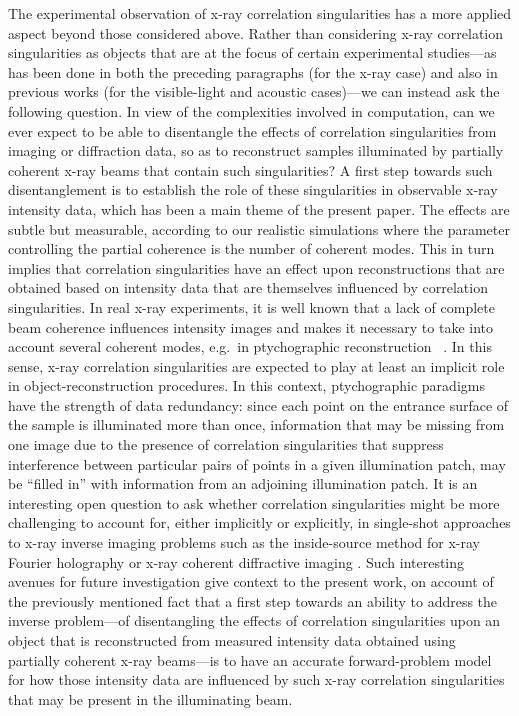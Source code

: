 \documentclass[%
 reprint,
 amsmath,amssymb,
 aps,
]{revtex4-1}
\begin{document}
The experimental observation of x-ray correlation singularities has a more applied aspect beyond those considered above.  Rather than considering x-ray correlation singularities as objects that are at the focus of certain experimental studies---as has been done in both the preceding paragraphs (for the x-ray case) and also in previous works (for the visible-light \cite{Bogatyryova2003,Palacios2004,Wang2006,Ambrosini2005} and acoustic \cite{Basano2005} cases)---we can instead ask the following question. In view of the complexities involved in computation, can we ever expect to be able to disentangle the effects of correlation singularities from imaging or diffraction data, so as to reconstruct samples illuminated by partially coherent x-ray beams that contain such singularities?  A first step towards such disentanglement is to establish the role of these singularities in observable x-ray intensity data, which has been a main theme of the present paper. The effects are subtle but measurable, according to our realistic simulations where the parameter controlling the partial coherence is the number of coherent modes. This in turn implies that correlation singularities have an effect upon reconstructions that are obtained based on intensity data that are themselves influenced by correlation singularities. In real x-ray experiments, it is well known that a lack of complete beam coherence influences intensity images and makes it necessary to take into account several coherent modes, e.g.~in ptychographic reconstruction  ~\cite{Stockmar2015}. In this sense, x-ray correlation singularities are expected to play at least an implicit role in object-reconstruction procedures.  In this context,  ptychographic paradigms \cite{Rodenburg2008} have the strength of data redundancy: since each point on the entrance surface of the sample is illuminated more than once, information that may be missing from one image due to the presence of correlation singularities that suppress interference between particular pairs of points in a given illumination patch, may be ``filled in'' with information from an adjoining illumination patch.  It is an interesting open question to ask whether correlation singularities might be more challenging to account for, either implicitly or explicitly, in single-shot approaches to x-ray inverse imaging problems such as the inside-source method for x-ray Fourier holography \cite{FaigelTegze1999} or x-ray coherent diffractive imaging \cite{CDI}.  Such interesting avenues for future investigation give context to the present work, on account of the previously mentioned fact that a first step towards an ability to address the inverse problem---of disentangling the effects of correlation singularities upon an object that is reconstructed from measured intensity data obtained using partially coherent x-ray beams---is to have an accurate forward-problem model for how those intensity data are influenced by such x-ray correlation singularities that may be present in the illuminating beam.
\end{document}
